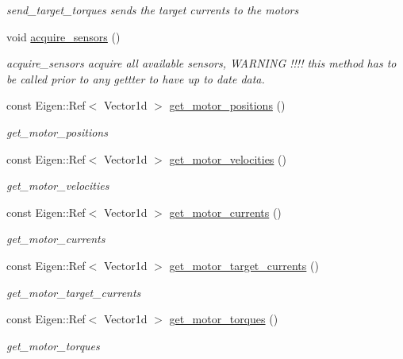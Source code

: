 \begin{DoxyCompactItemize}
\begin{DoxyCompactList}\small\item\em send\+\_\+target\+\_\+torques sends the target currents to the motors \end{DoxyCompactList}\item 
void \hyperlink{classblmc__robots_1_1SingleMotor_adbc3fb18b62ee085ff2d4d6bb2f107a4}{acquire\+\_\+sensors} ()
\begin{DoxyCompactList}\small\item\em acquire\+\_\+sensors acquire all available sensors, W\+A\+R\+N\+I\+NG !!!! this method has to be called prior to any gettter to have up to date data. \end{DoxyCompactList}\item 
const Eigen\+::\+Ref$<$ Vector1d $>$ \hyperlink{classblmc__robots_1_1SingleMotor_ac72b1daab642097f739ccdcb8388d6c9}{get\+\_\+motor\+\_\+positions} ()
\begin{DoxyCompactList}\small\item\em get\+\_\+motor\+\_\+positions \end{DoxyCompactList}\item 
const Eigen\+::\+Ref$<$ Vector1d $>$ \hyperlink{classblmc__robots_1_1SingleMotor_a8ee1b2b7d9b5bf83cd43511836e6074a}{get\+\_\+motor\+\_\+velocities} ()
\begin{DoxyCompactList}\small\item\em get\+\_\+motor\+\_\+velocities \end{DoxyCompactList}\item 
const Eigen\+::\+Ref$<$ Vector1d $>$ \hyperlink{classblmc__robots_1_1SingleMotor_ab3330ea642ca97c094f2af7b50a7a747}{get\+\_\+motor\+\_\+currents} ()
\begin{DoxyCompactList}\small\item\em get\+\_\+motor\+\_\+currents \end{DoxyCompactList}\item 
const Eigen\+::\+Ref$<$ Vector1d $>$ \hyperlink{classblmc__robots_1_1SingleMotor_af48038f9bc14cb4971d3f1aa54573daf}{get\+\_\+motor\+\_\+target\+\_\+currents} ()
\begin{DoxyCompactList}\small\item\em get\+\_\+motor\+\_\+target\+\_\+currents \end{DoxyCompactList}\item 
const Eigen\+::\+Ref$<$ Vector1d $>$ \hyperlink{classblmc__robots_1_1SingleMotor_a375565046712276a1f3bd941078a44fb}{get\+\_\+motor\+\_\+torques} ()
\begin{DoxyCompactList}\small\item\em get\+\_\+motor\+\_\+torques \end{DoxyCompactList}\item 

\end{DoxyCompactItemize}
